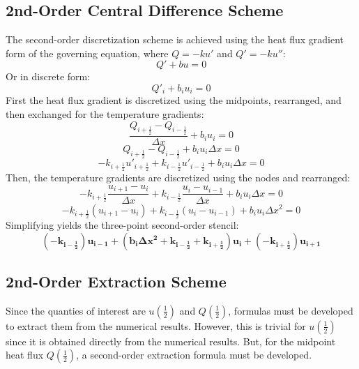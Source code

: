 \documentclass[10pt]{article}
\begin{document}
\subsection*{2nd-Order Central Difference Scheme}
The second-order discretization scheme is achieved using the heat flux gradient form of the governing equation, where $Q = -ku'$ and $Q' = -ku''$:
\begin{equation}
Q' + bu = 0
\end{equation}
Or in discrete form:
\begin{equation}
Q'_i + b_iu_i = 0
\end{equation}
First the heat flux gradient is discretized using the midpoints, rearranged, and then exchanged for the temperature gradients:
\begin{equation}
\frac{Q_{i+\tfrac{1}{2}}-Q_{i-\tfrac{1}{2}}}{\Delta x} + b_iu_i=0
\end{equation}
\begin{equation}
Q_{i+\tfrac{1}{2}}-Q_{i-\tfrac{1}{2}} + b_iu_i\Delta x=0
\end{equation}
\begin{equation}
-k_{i+\tfrac{1}{2}}u'_{i+\tfrac{1}{2}}+k_{i-\tfrac{1}{2}}u'_{i-\tfrac{1}{2}} + b_iu_i\Delta x=0
\end{equation}
Then, the temperature gradients are discretized using the nodes and rearranged:
\begin{equation}
-k_{i+\tfrac{1}{2}}\frac{u_{i+1}-u_i}{\Delta x} + k_{i-\tfrac{1}{2}}\frac{u_i-u_{i-1}}{\Delta x} + b_iu_i\Delta x=0
\end{equation}
\begin{equation}
-k_{i+\tfrac{1}{2}}(u_{i+1}-u_i) + k_{i-\tfrac{1}{2}}(u_i-u_{i-1}) + b_iu_i\Delta x^2=0
\end{equation}
Simplifying yields the three-point second-order stencil:
\begin{equation}
\mathbf{\left(-k_{i-\tfrac{1}{2}}\right)u_{i-1} + \left(b_i\Delta x^2 +k_{i-\tfrac{1}{2}} +k_{i+\tfrac{1}{2}} \right)u_{i} + \left(-k_{i+\tfrac{1}{2}}\right)u_{i+1}}
\end{equation}

\subsection*{2nd-Order Extraction Scheme}
Since the quanties of interest are $u(\tfrac{1}{2})$ and $Q(\tfrac{1}{2})$, formulas must be developed to extract them from the numerical results. However, this is trivial for $u(\tfrac{1}{2})$ since it is obtained directly from the numerical results. But, for the midpoint heat flux $Q(\tfrac{1}{2})$, a second-order extraction formula must be developed.
\end{document}
